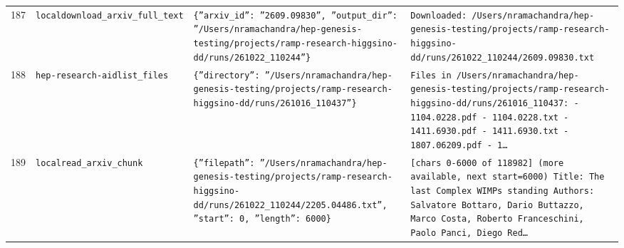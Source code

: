 \documentclass[11pt,a4paper]{article}
\begin{document}
\begin{longtable}{@{}p{}p{}p{}p{}@{}}
187 & \texttt{local}\newline\texttt{download\_\allowbreak{}arxiv\_\allowbreak{}full\_\allowbreak{}text} & \texttt{\{''arxiv\_\allowbreak{}id'':\allowbreak{} ''2609.09830'',\allowbreak{} ''output\_\allowbreak{}dir'':\allowbreak{} ''/\allowbreak{}Users/\allowbreak{}nramachandra/\allowbreak{}hep-genesis-testing/\allowbreak{}projects/\allowbreak{}ramp-research-higgsino-dd/\allowbreak{}runs/\allowbreak{}261022\_\allowbreak{}110244''\}\allowbreak{}} & \texttt{Downloaded:\allowbreak{} /\allowbreak{}Users/\allowbreak{}nramachandra/\allowbreak{}hep-genesis-testing/\allowbreak{}projects/\allowbreak{}ramp-research-higgsino-dd/\allowbreak{}runs/\allowbreak{}261022\_\allowbreak{}110244/\allowbreak{}2609.09830.txt} \\
188 & \texttt{hep-research-aid}\newline\texttt{list\_\allowbreak{}files} & \texttt{\{''directory'':\allowbreak{} ''/\allowbreak{}Users/\allowbreak{}nramachandra/\allowbreak{}hep-genesis-testing/\allowbreak{}projects/\allowbreak{}ramp-research-higgsino-dd/\allowbreak{}runs/\allowbreak{}261016\_\allowbreak{}110437''\}\allowbreak{}} & \texttt{Files in /\allowbreak{}Users/\allowbreak{}nramachandra/\allowbreak{}hep-genesis-testing/\allowbreak{}projects/\allowbreak{}ramp-research-higgsino-dd/\allowbreak{}runs/\allowbreak{}261016\_\allowbreak{}110437:\allowbreak{}   - 1104.0228.pdf   - 1104.0228.txt   - 1411.6930.pdf   - 1411.6930.txt   - 1807.06209.pdf   - 1\ldots{}\allowbreak{}} \\
189 & \texttt{local}\newline\texttt{read\_\allowbreak{}arxiv\_\allowbreak{}chunk} & \texttt{\{''filepath'':\allowbreak{} ''/\allowbreak{}Users/\allowbreak{}nramachandra/\allowbreak{}hep-genesis-testing/\allowbreak{}projects/\allowbreak{}ramp-research-higgsino-dd/\allowbreak{}runs/\allowbreak{}261022\_\allowbreak{}110244/\allowbreak{}2205.04486.txt'',\allowbreak{} ''start'':\allowbreak{} 0,\allowbreak{} ''length'':\allowbreak{} 6000\}\allowbreak{}} & \texttt{[chars 0-6000 of 118982]\allowbreak{} (more available,\allowbreak{} next start=\allowbreak{}6000)\allowbreak{}  Title:\allowbreak{} The last Complex WIMPs standing Authors:\allowbreak{} Salvatore Bottaro,\allowbreak{} Dario Buttazzo,\allowbreak{} Marco Costa,\allowbreak{} Roberto Franceschini,\allowbreak{} Paolo Panci,\allowbreak{} Diego Red\ldots{}\allowbreak{}} \\

\end{longtable}
\end{document}
